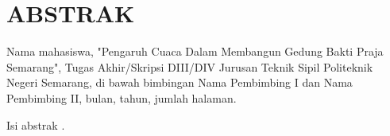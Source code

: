 \chapter*{ABSTRAK}
Nama mahasiswa, "Pengaruh Cuaca Dalam Membangun Gedung Bakti Praja Semarang", Tugas Akhir/Skripsi DIII/DIV Jurusan Teknik Sipil Politeknik Negeri Semarang, di bawah bimbingan Nama Pembimbing I dan Nama Pembimbing II, bulan, tahun, jumlah halaman.

Isi abstrak \underline{\hspace{5cm}}.
